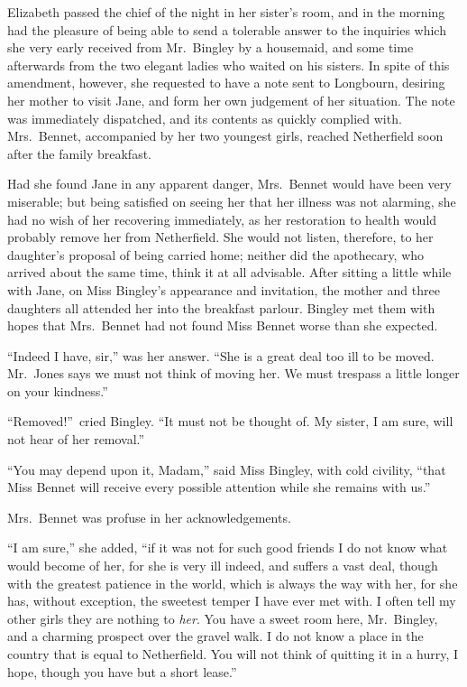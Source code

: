 \documentclass[12pt,english]{book}
\begin{document}

Elizabeth passed the chief of the night in her sister's room, and
in the morning had the pleasure of being able to send a tolerable
answer to the inquiries which she very early received from Mr.\ Bingley
by a housemaid, and some time afterwards from the two elegant ladies
who waited on his sisters. In spite of this amendment, however, she
requested to have a note sent to Longbourn, desiring her mother to
visit Jane, and form her own judgement of her situation. The note
was immediately dispatched, and its contents as quickly complied with.
Mrs.\ Bennet, accompanied by her two youngest girls, reached Netherfield
soon after the family breakfast.

Had she found Jane in any apparent danger, Mrs.\ Bennet would have
been very miserable; but being satisfied on seeing her that her illness
was not alarming, she had no wish of her recovering immediately, as
her restoration to health would probably remove her from Netherfield.
She would not listen, therefore, to her daughter's proposal of being
carried home; neither did the apothecary, who arrived about the same
time, think it at all advisable. After sitting a little while with
Jane, on Miss Bingley's appearance and invitation, the mother and
three daughters all attended her into the breakfast parlour. Bingley
met them with hopes that Mrs.\ Bennet had not found Miss Bennet worse
than she expected.

{}``Indeed I have, sir,'' was her answer. {}``She is a great deal
too ill to be moved. Mr.\ Jones says we must not think of moving
her. We must trespass a little longer on your kindness.''

{}``Removed!''\ cried Bingley. {}``It must not be thought of.
My sister, I am sure, will not hear of her removal.''

{}``You may depend upon it, Madam,'' said Miss Bingley, with cold
civility, {}``that Miss Bennet will receive every possible attention
while she remains with us.''

Mrs.\ Bennet was profuse in her acknowledgements.

{}``I am sure,'' she added, {}``if it was not for such good friends
I do not know what would become of her, for she is very ill indeed,
and suffers a vast deal, though with the greatest patience in the
world, which is always the way with her, for she has, without exception,
the sweetest temper I have ever met with. I often tell my other girls
they are nothing to \textit{her}. You have a sweet room here, Mr.\ Bingley,
and a charming prospect over the gravel walk. I do not know a place
in the country that is equal to Netherfield. You will not think of
quitting it in a hurry, I hope, though you have but a short lease.''
\end{document}
